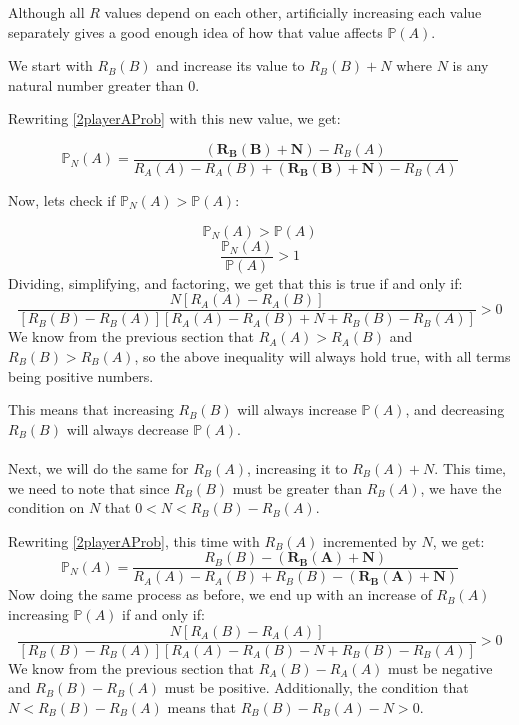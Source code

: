 \documentclass[english,12pt,a4paper,final]{article}
\begin{document}
Although all $R$ values depend on each other, artificially increasing each value separately gives a good enough idea of how that value affects $\mathbb{P}(A)$.

We start with $R_B(B)$ and increase its value to $R_B(B) + N$ where $N$ is any natural number greater than 0.

Rewriting \eqref{2playerAProb} with this new value, we get:

\begin{equation*}
	\mathbb{P}_N(A)=\frac{\boldsymbol{(R_B(B)+N)}-R_B(A)}{R_A(A)-R_A(B)+\boldsymbol{(R_B(B)+N)}-R_B(A)}
\end{equation*}

Now, lets check if $\mathbb{P}_N(A) > \mathbb{P}(A)$:

\begin{equation*}
	\mathbb{P}_N(A) > \mathbb{P}(A)
\end{equation*}
\begin{equation*}
	\frac{\mathbb{P}_N(A)}{\mathbb{P}(A)} > 1
\end{equation*}
Dividing, simplifying, and factoring, we get that this is true if and only if:
\begin{equation*}
	\frac{N\left[R_A(A)-R_A(B)\right]}{\left[R_B(B)-R_B(A)\right]\left[R_A(A)-R_A(B)+N+R_B(B)-R_B(A)\right]} > 0
\end{equation*}
We know from the previous section that $R_A(A) > R_A(B)$ and $R_B(B) > R_B(A)$, so the above inequality will always hold true, with all terms being positive numbers.

This means that increasing $R_B(B)$ will always increase $\mathbb{P}(A)$, and decreasing $R_B(B)$ will always decrease $\mathbb{P}(A)$.
\\\\
Next, we will do the same for $R_B(A)$, increasing it to $R_B(A)+N$. This time, we need to note that since $R_B(B)$ must be greater than $R_B(A)$, we have the condition on $N$ that $0 < N < R_B(B)-R_B(A)$.

Rewriting \eqref{2playerAProb}, this time with $R_B(A)$ incremented by $N$, we get:
\begin{equation*}
	\mathbb{P}_N(A) = \frac{R_B(B)-\boldsymbol{(R_B(A)+N)}}{R_A(A)-R_A(B)+R_B(B)-\boldsymbol{(R_B(A)+N)}}
\end{equation*}
Now doing the same process as before, we end up with an increase of $R_B(A)$ increasing $\mathbb{P}(A)$ if and only if:
\begin{equation*}
	\frac{N\left[R_A(B)-R_A(A)\right]}{\left[R_B(B)-R_B(A)\right]\left[R_A(A)-R_A(B)-N+R_B(B)-R_B(A)\right]} > 0
\end{equation*}
We know from the previous section that $R_A(B)-R_A(A)$ must be negative and $R_B(B)-R_B(A)$ must be positive. Additionally, the condition that $N < R_B(B)-R_B(A)$ means that $R_B(B)-R_B(A)-N > 0$.
\end{document}
